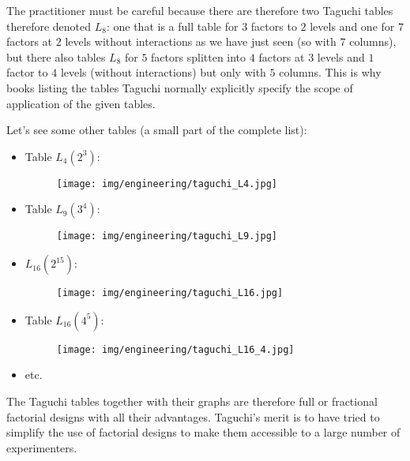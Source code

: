 	\begin{tcolorbox}[title=Remark,colframe=black,arc=10pt]
	The practitioner must be careful because there are therefore two Taguchi tables therefore denoted $L_8$: one that is a full table for $3$ factors to $2$ levels and one for $7$ factors at $2$ levels without interactions as we have just seen (so with $7$ columns), but there also tables $L_8$ for $5$ factors splitten into $4$ factors at $3$ levels and $1$ factor to $4$ levels (without interactions) but only with $5$ columns. This is why books listing the tables Taguchi normally explicitly specify the scope of application of the given tables.
	\end{tcolorbox}
	Let's see some other tables (a small part of the complete list):
	\begin{itemize}
		\item Table $L_4 (2^3)$:
		
		\begin{figure}[H]
			\begin{center}
			\texttt{[image: img/engineering/taguchi\_L4.jpg]}
			\end{center}	
		\end{figure}
		
		\item Table $L_9 (3^4)$:
		
		\begin{figure}[H]
			\begin{center}
			\texttt{[image: img/engineering/taguchi\_L9.jpg]}
			\end{center}	
		\end{figure}
		
		\item $L_{16} (2^{15})$:
		
		\begin{figure}[H]
			\begin{center}
			\texttt{[image: img/engineering/taguchi\_L16.jpg]}
			\end{center}	
		\end{figure}
		
		\item Table $L_{16} (4^5)$:
				
		\begin{figure}[H]
			\begin{center}
			\texttt{[image: img/engineering/taguchi\_L16\_4.jpg]}
			\end{center}	
		\end{figure}
		
		\item etc.
	\end{itemize}
	The Taguchi tables together with their graphs are therefore full or fractional factorial designs with all their advantages. Taguchi's merit is to have tried to simplify the use of factorial designs to make them accessible to a large number of experimenters. 
	
